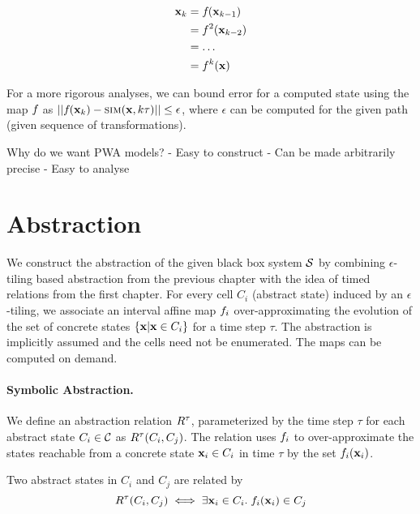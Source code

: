 \begin{align}
    \mathbf{x}_k &= f_{}(\mathbf{x}_{k-1}) \nonumber\\
          &= f_{}^2(\mathbf{x}_{k-2}) \nonumber\\
          &= \ldots \nonumber\\
          &= f_{}^k(\mathbf{x})
\end{align}

For a more rigorous analyses, we can bound error for a computed state
using the map $f_{}$ as $||f_{}(\mathbf{x}_k) - \mbox{\sc sim}(\mathbf{x}, k\tau)||
\le \epsilon$, where $\epsilon$ can be computed for the given path
(given sequence of transformations).

Why do we want PWA models?
- Easy to construct
- Can be made arbitrarily precise
- Easy to analyse

\section{Abstraction}

We construct the abstraction of the given black box system $\mathcal{S}$ by
combining $\epsilon$-tiling based abstraction from the previous
chapter with the idea of timed relations from the first chapter. For
every cell $C_i$ (abstract state) induced by an $\epsilon$-tiling, we
associate an interval affine map $f_{i}$ over-approximating the
evolution of the set of concrete states $\{\mathbf{x} | \mathbf{x} \in C_i\}$
for a time step $\tau$. The abstraction is implicitly assumed and the
cells need not be enumerated. The maps can be computed on demand.

\paragraph{Symbolic Abstraction.} We define an abstraction relation
$R^{\tau}$, parameterized by the time step $\tau$ for each abstract
state $C_i \in \mathcal{C}$ as $R^{\tau}(C_i,C_j)$. The relation uses
$f_{i}$ to over-approximate the states reachable from a concrete
state $\mathbf{x}_i \in C_i$ in time $\tau$ by the set $f_{i}(\mathbf{x}_i)$.

    Two abstract states in $C_i$ and $C_j$ are related by
    \[R^{\tau}(C_i,C_j) \iff \exists \mathbf{x}_i \in C_i.\; f_{i}(\mathbf{x}_i)
    \in C_j\]

